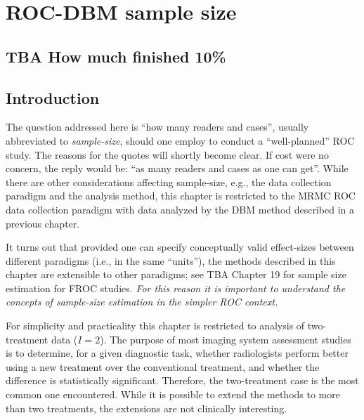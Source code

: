 \documentclass[
]{book}
\begin{document}
\hypertarget{roc-sample-size-dbm}{%
\chapter{ROC-DBM sample size}\label{roc-sample-size-dbm}}

\hypertarget{roc-sample-size-dbm-how-much-finished}{%
\section{TBA How much finished 10\%}\label{roc-sample-size-dbm-how-much-finished}}

\hypertarget{roc-sample-size-dbm-introduction}{%
\section{Introduction}\label{roc-sample-size-dbm-introduction}}

The question addressed here is ``how many readers and cases'', usually abbreviated to \emph{sample-size}, should one employ to conduct a ``well-planned'' ROC study. The reasons for the quotes will shortly become clear. If cost were no concern, the reply would be: ``as many readers and cases as one can get''. While there are other considerations affecting sample-size, e.g., the data collection paradigm and the analysis method, this chapter is restricted to the MRMC ROC data collection paradigm with data analyzed by the DBM method described in a previous chapter.

It turns out that provided one can specify conceptually valid effect-sizes between different paradigms (i.e., in the same ``units''), the methods described in this chapter are extensible to other paradigms; see TBA Chapter 19 for sample size estimation for FROC studies. \emph{For this reason it is important to understand the concepts of sample-size estimation in the simpler ROC context.}

For simplicity and practicality this chapter is restricted to analysis of two-treatment data (\(I = 2\)). The purpose of most imaging system assessment studies is to determine, for a given diagnostic task, whether radiologists perform better using a new treatment over the conventional treatment, and whether the difference is statistically significant. Therefore, the two-treatment case is the most common one encountered. While it is possible to extend the methods to more than two treatments, the extensions are not clinically interesting.
\end{document}
